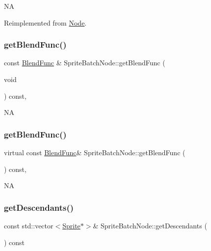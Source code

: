 NA 

Reimplemented from \hyperlink{classNode_abcf85087a15901deb7c6c1231634c8ab}{Node}.

\mbox{\label{classSpriteBatchNode_a3ea94541fdb496876c1397aabf991474}} 
\subsubsection{\texorpdfstring{get\+Blend\+Func()}{getBlendFunc()}\hspace{0.1cm}{\footnotesize\ttfamily [1/2]}}
{\footnotesize\ttfamily const \hyperlink{structBlendFunc}{Blend\+Func} \& Sprite\+Batch\+Node\+::get\+Blend\+Func (\begin{DoxyParamCaption}\item[{void}]{ }\end{DoxyParamCaption}) const\hspace{0.3cm}{\ttfamily [override]}, {\ttfamily [virtual]}}

NA \mbox{\label{classSpriteBatchNode_a06bd31ad6fda00cf601229736c2cf2ca}} 
\subsubsection{\texorpdfstring{get\+Blend\+Func()}{getBlendFunc()}\hspace{0.1cm}{\footnotesize\ttfamily [2/2]}}
{\footnotesize\ttfamily virtual const \hyperlink{structBlendFunc}{Blend\+Func}\& Sprite\+Batch\+Node\+::get\+Blend\+Func (\begin{DoxyParamCaption}{ }\end{DoxyParamCaption}) const\hspace{0.3cm}{\ttfamily [override]}, {\ttfamily [virtual]}}

NA \mbox{\label{classSpriteBatchNode_adcf146809bbf5d09e2228cf1cff65e06}} 
\subsubsection{\texorpdfstring{get\+Descendants()}{getDescendants()}\hspace{0.1cm}{\footnotesize\ttfamily [1/2]}}
{\footnotesize\ttfamily const std\+::vector$<$\hyperlink{classSprite}{Sprite}$\ast$$>$\& Sprite\+Batch\+Node\+::get\+Descendants (\begin{DoxyParamCaption}{ }\end{DoxyParamCaption}) const\hspace{0.3cm}{\ttfamily [inline]}}

